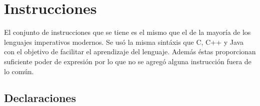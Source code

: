 \documentclass[11pt, spanish]{report}
\begin{document}
\section{Instrucciones}

El conjunto de instrucciones que se tiene es el mismo que el de la mayor\'ia de los lenguajes imperativos modernos. Se us\'o la misma sint\'axis que C, C++ 
y Java con el objetivo de facilitar el aprendizaje del lenguaje. Adem\'as \'estas proporcionan suficiente poder de expresi\'on por lo que no se 
agreg\'o alguna instrucci\'on fuera de lo com\'un.\\

\subsection{Declaraciones}
\end{document}
